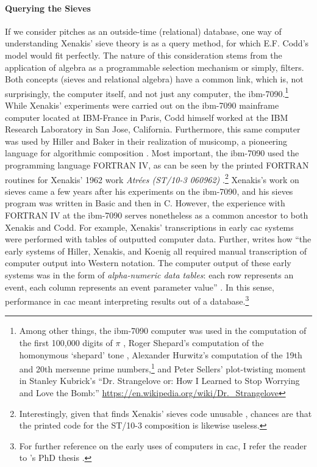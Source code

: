 \paragraph{Querying the Sieves}
If we consider pitches as an outside-time (relational) database, one way of understanding Xenakis' sieve theory is as a query method, for which E.F. Codd's  model would fit perfectly. The nature of this consideration stems from the application of algebra as a programmable selection mechanism or simply, filters. Both concepts (sieves and relational algebra) have a common link, which is, not surprisingly, the computer itself, and not just any computer, the \gls{ibm-7090}.\footnote{Among other things, the \gls{ibm-7090} computer was used in the computation of the first 100,000 digits of $\pi$ \parencite{picalc}, Roger Shepard's computation of the homonymous `shepard' tone \parencite{shepard}, Alexander Hurwitz's computation of the 19th and 20th mersenne prime numbers,\footnote{\url{https://www.mersenne.org/primes/}} and Peter Sellers' plot-twisting moment in Stanley Kubrick's ``Dr. Strangelove or: How I Learned to Stop Worrying and Love the Bomb:'' \url{https://en.wikipedia.org/wiki/Dr._Strangelove}} While Xenakis' experiments were carried out on the \gls{ibm-7090} mainframe computer located at IBM-France in Paris, Codd himself worked at the IBM Research Laboratory in San Jose, California. Furthermore, this same computer was used by Hiller and Baker in their realization of \gls{musicomp}, a pioneering language for algorithmic composition \parencite[44]{Ari05:Ano}. Most important, the \gls{ibm-7090} used the programming language FORTRAN IV, as can be seen by the printed FORTRAN routines for Xenakis' 1962 work \textit{Atrées (ST/10-3 060962)} \parencite[145]{Xen92:For}.\footnote{Interestingly, given that \citeauthor{arizaSieves} finds Xenakis' sieves code unusable \parencite[1]{arizaSieves}, chances are that the printed code for the ST/10-3 composition is likewise useless.} Xenakis's work on sieves came a few years after his experiments on the \gls{ibm-7090}, and his sieves program was written in Basic and then in C. However, the experience with FORTRAN IV at the \gls{ibm-7090} serves nonetheless as a common ancestor to both Xenakis and Codd. For example, Xenakis' transcriptions in early \gls{cac} systems were performed with tables of outputted computer data. Further, \citeauthor{Ari05:Ano} \parencite{Ari05:Ano} writes how ``the early systems of Hiller, Xenakis, and Koenig all required manual transcription of computer output into Western notation. The computer output of these early systems was in the form of \textit{alpha-numeric data tables}: each row represents an event, each column represents an event parameter value'' \im \parencite[94]{Ari05:Ano}. In this sense, performance in \gls{cac} meant interpreting results out of a database.\footnote{For further reference on the early uses of computers in \gls{cac}, I refer the reader to \citeauthor{Ari05:Ano}'s PhD thesis \parencite{Ari05:Ano}.}


